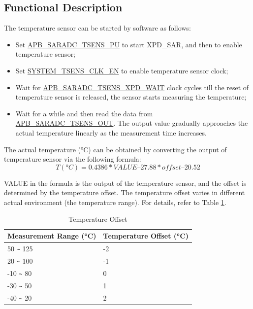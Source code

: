 \documentclass[main\_\_EN.tex]{subfiles}
\begin{document}
\subsection{Functional Description}

The temperature sensor can be started by software as follows:
    \begin{itemize}
        \item Set \hyperref[fielddesc:APBSARADCTSENSPU]{APB\_SARADC\_TSENS\_PU} to start XPD\_SAR,
        and then to enable temperature sensor;
        \item Set \hyperref[fielddesc:SYSTEMTSENSCLKEN]{SYSTEM\_TSENS\_CLK\_EN} to enable temperature sensor clock;
        \item Wait for \hyperref[fielddesc:APBSARADCTSENSXPDWAIT]{APB\_SARADC\_TSENS\_XPD\_WAIT} clock cycles till the reset of temperature sensor is released, the sensor starts measuring the temperature;
        \item Wait for a while and then read the data from \hyperref[fielddesc:APBSARADCTSENSOUT]{APB\_SARADC\_TSENS\_OUT}. The output value gradually approaches the actual temperature linearly as the measurement time increases.
    \end{itemize}



The actual temperature (°C) can be obtained by converting the output of temperature sensor via the following formula:
\[
        T(°C) = 0.4386 * VALUE – 27.88 * offset – 20.52
\]

VALUE in the formula is the output of the temperature sensor, and the offset is determined by the temperature offset. The temperature offset varies in different actual environment (the temperature range). For details, refer to Table \ref{tab:tsensor-dac}.

\begin{longtable}[c]{|p{4cm}|p{4cm}|}
    \caption{Temperature Offset}
    \label{tab:tsensor-dac}
    \\\hline
    \rowcolor{lightgray}
    Measurement Range (°C)  & Temperature Offset (°C) \\\hline
    50 \verb+~+ 125 & -2 \\\hline
    20 \verb+~+ 100 & -1 \\\hline
    -10 \verb+~+ 80 & 0 \\\hline
    -30 \verb+~+ 50 & 1 \\\hline
    -40 \verb+~+ 20 & 2 \\\hline
\end{longtable}
\end{document}
